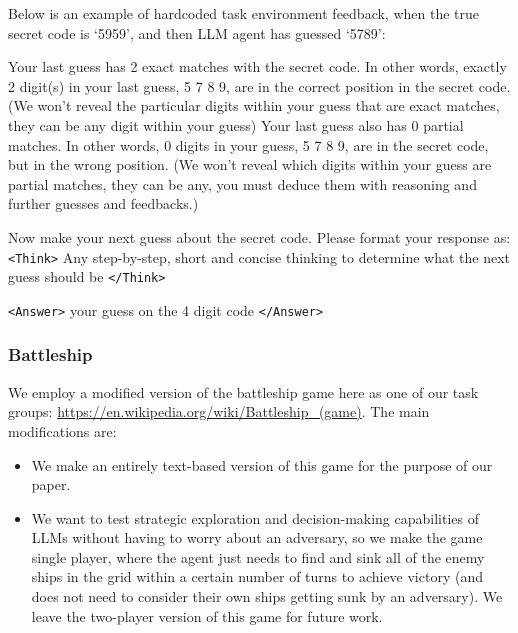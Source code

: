 \newpage

Below is an example of hardcoded task environment feedback, when the true secret code is `5959', and then LLM agent has guessed `5789':

\begin{tcolorbox}[colback=gray!20, colframe=black, title=Mastermind Task Environment Feedback]
Your last guess has 2 exact matches with the secret code. In other words, exactly 2 digit(s) in your last guess, 5 7 8 9, are in the correct position in the secret code. (We won't reveal the particular digits within your guess that are exact matches, they can be any digit within your guess) Your last guess also has 0 partial matches. In other words, 0 digits in your guess, 5 7 8 9, are in the secret code, but in the wrong position. (We won't reveal which digits within your guess are partial matches, they can be any, you must deduce them with reasoning and further guesses and feedbacks.)

Now make your next guess about the secret code. Please format your response as: \texttt{<Think>} Any step-by-step, short and concise thinking to determine what the next guess should be \texttt{</Think>}

\texttt{<Answer>} your guess on the 4 digit code \texttt{</Answer>}

\end{tcolorbox}

\newpage

\subsubsection{Battleship}

We employ a modified version of the battleship game here as one of our task groups: \url{https://en.wikipedia.org/wiki/Battleship_(game)}. The main modifications are:

\begin{itemize}
    \item We make an entirely text-based version of this game for the purpose of our paper.
    \item We want to test strategic exploration and decision-making capabilities of LLMs without having to worry about an adversary, so we make the game single player, where the agent just needs to find and sink all of the enemy ships in the grid within a certain number of turns to achieve victory (and does not need to consider their own ships getting sunk by an adversary). We leave the two-player version of this game for future work.
\end{itemize}

